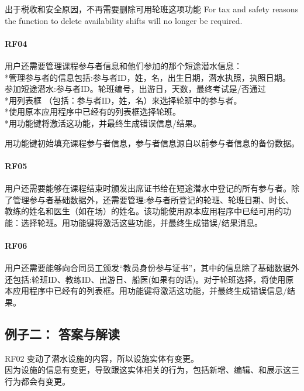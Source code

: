 出于税收和安全原因，不再需要删除可用轮班这项功能 For tax and safety
reasons the function to delete availability shifts will no longer be
required.

\hypertarget{rf04}{%
\paragraph{RF04}\label{rf04}}

用户还需要管理课程参与者信息和他们参加的那个短途潜水信息：\\
*管理参与者的信息包括:参与者ID，姓，名，出生日期，潜水执照，执照日期。\\
参加短途潜水:参与者ID。轮班编号，出游日，天数，最终考试是/否通过\\
*用列表框 （包括：参与者ID，姓，名）来选择轮班中的参与者。\\
*使用原本应用程序中已经有的列表框选择轮班。\\
*用功能键将激活这功能，并最终生成错误信息/结果。

用功能键初始填充课程参与者信息，参与者信息源自以前参与者信息的备份数据。

\hypertarget{rf05}{%
\paragraph{RF05}\label{rf05}}

用户还需要能够在课程结束时颁发出席证书给在短途潜水中登记的所有参与者。除了管理参与者基础数据外，还需要管理:参与者所登记的轮班、轮班日期、时长、教练的姓名和医生（如在场）的姓名。该功能使用原本应用程序中已经可用的功能：选择轮班。用功能键将激活这些功能，并最终生成错误/结果消息。

\hypertarget{rf06}{%
\paragraph{RF06}\label{rf06}}

用户还需要能够向合同员工颁发``教员身份参与证书''，其中的信息除了基础数据外还包括:轮班ID、教练ID、出游日、船医(如果有的话)。对于轮班选择，将使用原本应用程序中已经有的列表框。用功能键将激活这功能，并最终生成错误信息/结果。

\hypertarget{ux4f8bux5b50ux4e8c-ux7b54ux6848ux4e0eux89e3ux8bfb}{%
\subsection{例子二：
答案与解读}\label{ux4f8bux5b50ux4e8c-ux7b54ux6848ux4e0eux89e3ux8bfb}}

RF02 变动了潜水设施的内容，所以设施实体有变更。\\
因为设施的信息有变更，导致跟这实体相关的行为，包括新增、编辑、和展示这三行为都会有变更。

